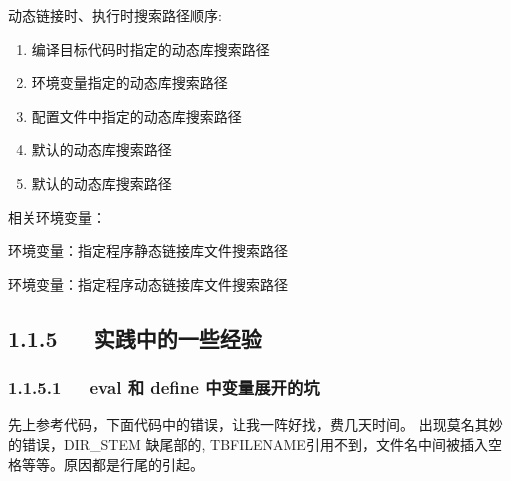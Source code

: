 \documentclass[letterpaper,12pt,english]{sphinxmanual}
\begin{document}
动态链接时、执行时搜索路径顺序:
\begin{enumerate}
%
\item {} 
编译目标代码时指定的动态库搜索路径

\item {} 
环境变量指定的动态库搜索路径

\item {} 
配置文件中指定的动态库搜索路径

\item {} 
默认的动态库搜索路径

\item {} 
默认的动态库搜索路径

\end{enumerate}

\begin{DUlineblock}{0em}
\item[] 相关环境变量：
\item[] 环境变量：指定程序静态链接库文件搜索路径
\item[] 环境变量：指定程序动态链接库文件搜索路径
\end{DUlineblock}


\subsection{1.1.5   实践中的一些经验}
\label{\detokenize{001software/001install/make:id15}}

\subsubsection{1.1.5.1   eval 和 define 中变量展开的坑}
\label{\detokenize{001software/001install/make:eval-define}}
先上参考代码，下面代码中的错误，让我一阵好找，费几天时间。
出现莫名其妙的错误，DIR\_STEM 缺尾部的, TBFILENAME引用不到，文件名中间被插入空格等等。原因都是行尾的引起。
\end{document}
